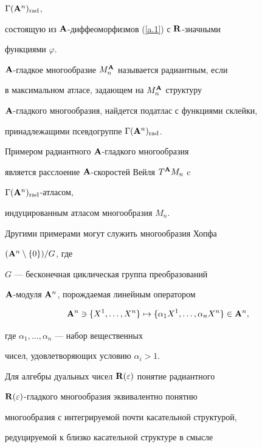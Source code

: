 $\Gamma({\bold A}^n)_{\operatorname{rad}}$,


состоящую из ${\bold A}$-диффеоморфизмов (\ref{a.1}) с ${\bold R}$-значными


функциями $\varphi$.








\begin{defn}


${\bold A}$-гладкое многообразие $M^{\bold A}_n$ называется радиантным, если


в максимальном атласе, задающем на $M^{\bold A}_n$ структуру


${\bold A}$-гладкого многообразия, найдется податлас с функциями склейки,


принадлежащими псевдогруппе $\Gamma({\bold A}^n)_{\operatorname{rad}}$.


\end{defn}





Примером радиантного ${\bold A}$-гладкого многообразия


является расслоение ${\bold A}$-скоростей Вейля $T^{\bold A} M_n$ c


$\Gamma({\bold A}^n)_{\operatorname{rad}}$-атласом,


индуцированным атласом многообразия  $M_n$.


Другими примерами могут служить многообразия Хопфа


$({\bold A}^n\setminus\{0\})/G$, где


$G$ --- бесконечная циклическая группа преобразований


${\bold A}$-модуля ${\bold A}^n$, порождаемая линейным оператором


$$


\A^n\ni\{X^1,\dotsc,X^n\}\mapsto


\{\alpha_1X^1,\dotsc,\alpha_nX^n\}\in\A^n,


$$


где $\alpha_1,\dotsc,\alpha_n$ --- набор вещественных


чисел, удовлетворяющих  условию $\alpha_i>1$.





Для алгебры дуальных чисел ${\bold R}(\varepsilon)$ понятие радиантного


${\bold R}(\varepsilon)$-гладкого многообразия эквивалентно понятию


многообразия с интегрируемой почти касательной структурой,


редуцируемой к близко касательной структуре в смысле



